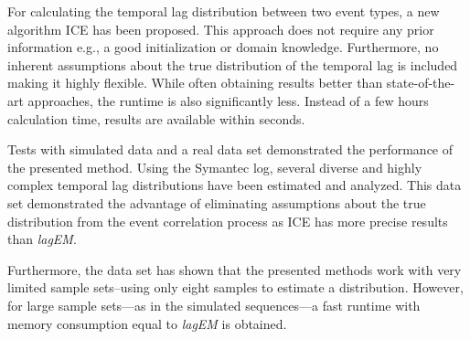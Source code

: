 \documentclass[conference]{IEEEtran}
\theoremstyle{examplestyle}
\begin{document}
For calculating the temporal lag distribution between two event types, a new algorithm \ac{ICE} has been proposed. This approach does not require any prior information e.g., a good initialization or domain knowledge. Furthermore, no inherent assumptions about the true distribution of the temporal lag is included making it highly flexible. While often obtaining results better than state-of-the-art approaches, the runtime is also significantly less. Instead of a few hours calculation time, results are available within seconds.

Tests with simulated data and a real data set demonstrated the performance of the presented method. Using the Symantec log, several diverse and highly complex temporal lag distributions have been estimated and analyzed. This data set demonstrated the advantage of eliminating assumptions about the true distribution from the event correlation process as \ac{ICE} has more precise results than \textit{lagEM}.

Furthermore, the data set has shown that the presented methods work with very limited sample sets--using only eight samples to estimate a distribution. However, for large sample sets---as in the simulated sequences---a fast runtime with memory consumption equal to \textit{lagEM} is obtained.









\end{document}
